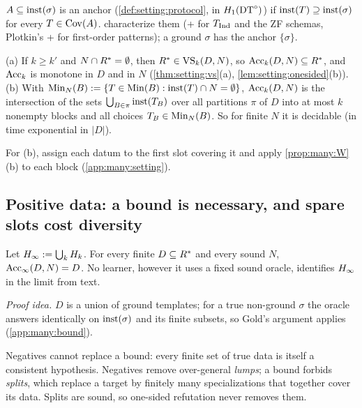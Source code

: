 $A\subseteq\mathrm{inst}(\sigma)$ is an anchor (\cref{def:setting:protocol}, in $H_{1}(\mathrm{DT}^{\circ})$) if $\mathrm{inst}(T)\supseteq\mathrm{inst}(\sigma)$ for
every $T\in\mathrm{Cov}(A)$.
 characterize them (\evR{}+\evN{} for $T_{\mathrm{Ind}}$ and the ZF schemas, Plotkin's
\evR{}+\evD{} for first-order patterns); a ground $\sigma$ has the anchor $\{\sigma\}$.

\begin{lemma}\label{lem:many:cautious}
(a) If $k\ge k'$ and $N\cap R^{*}=\emptyset$, then $R^{*}\in\mathrm{VS}_k(D,N)$, so $\mathrm{Acc}_k(D,N)\subseteq R^{*}$,
and $\mathrm{Acc}_k$ is monotone in $D$ and in $N$ (\cref{thm:setting:vs}(a), \cref{lem:setting:onesided}(b)).
(b) With $\mathrm{Min}_N(B):=\{T\in\mathrm{Min}(B):\mathrm{inst}(T)\cap N=\emptyset\}$, $\mathrm{Acc}_k(D,N)$ is the intersection of the sets
$\bigcup_{B\in\pi}\mathrm{inst}(T_B)$ over all partitions $\pi$ of $D$ into at most $k$ nonempty blocks and all choices
$T_B\in\mathrm{Min}_N(B)$. So for finite $N$ it is decidable (in time exponential in $|D|$).
\end{lemma}
\noindent For (b), assign each datum to the first slot covering it and apply \cref{prop:many:W}(b) to each block
(\cref{app:many:setting}).

\subsection{Positive data: a bound is necessary, and spare slots cost diversity}\label{sec:many:bound}

\begin{proposition}\label{prop:many:bound}
Let $H_{\infty}:=\bigcup_kH_{k}$. For every finite $D\subseteq R^{*}$ and every sound $N$, $\mathrm{Acc}_\infty(D,N)=D$.
No learner, however it uses a fixed sound oracle, identifies $H_{\infty}$ in the limit from text.
\end{proposition}
\noindent\emph{Proof idea.} $D$ is a union of ground templates; for a true non-ground $\sigma$ the oracle answers
identically on $\mathrm{inst}(\sigma)$ and its finite subsets, so Gold's argument applies (\cref{app:many:bound}).\medskip

Negatives cannot replace a bound: every finite set of true data is itself a consistent hypothesis. Negatives remove
over-general \emph{lumps}; a bound forbids \emph{splits}, which replace a target by finitely many specializations that
together cover its data. Splits are sound, so one-sided refutation never removes them.

